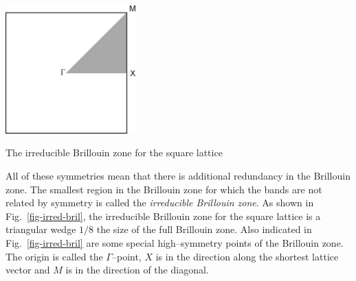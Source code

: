 \begin{marginfigure}
\centering
\includegraphics[width=5cm]{symmetry/figures/irred_bril}
\caption{The irreducible Brillouin zone for the square lattice}
\label{fig-irred-bril}
\end{marginfigure}

All of these symmetries mean that there is additional redundancy in the Brillouin zone. The smallest region in the Brillouin zone for which the bands are not related by symmetry is called the \emph{irreducible Brillouin zone}. As shown in Fig.~\ref{fig-irred-bril}, the irreducible Brillouin zone for the square lattice is a triangular wedge $1/8$ the size of the full Brillouin zone. Also indicated in Fig.~\ref{fig-irred-bril} are some special high--symmetry points of the Brillouin zone. The origin is called the $\Gamma$--point, $X$ is in the direction along the shortest lattice vector and $M$ is in the direction of the diagonal. 



